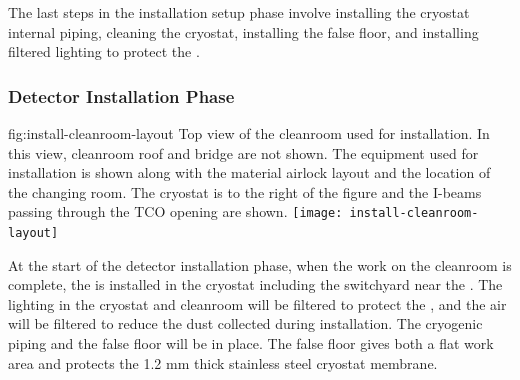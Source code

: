 The last steps in the installation setup phase involve installing the cryostat internal piping, cleaning the cryostat, installing the false floor, and installing filtered lighting to protect the . 


\subsubsection{Detector Installation Phase}

\begin{dunefigure}{fig:install-cleanroom-layout}
  {Top view of the cleanroom used for installation. In this view, cleanroom roof and bridge are not shown. The equipment used for installation is shown along with the material airlock layout and the location of the changing room. The cryostat is to the right of the figure and the I-beams passing through the TCO opening are shown.}
 \texttt{[image: install-cleanroom-layout]}
\end{dunefigure}

At the start of the detector installation phase, when the work on the cleanroom is complete, the  is installed in the cryostat including the switchyard near the . 
The lighting in the cryostat and cleanroom will be filtered to protect the , and the air will be filtered to reduce the dust collected during installation. 
The cryogenic piping and the false floor will be in place. 
The false floor gives both a flat work area and protects the 1.2 \si{mm} thick stainless steel cryostat membrane. 
          
